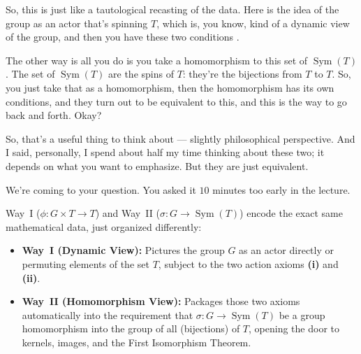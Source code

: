 \begin{speech}[01:10:50 - 01:11:56]
So, this is just like a tautological recasting of the data. Here  is the idea of the group as an actor that's spinning $T$, which is, you know, kind of a dynamic view of the group, and then you have these two conditions .

The other way  is all you do is you take a homomorphism to this set of $\operatorname{Sym}(T)$. The set of $\operatorname{Sym}(T)$ are the spins of $T$: they're the bijections from $T$ to $T$. So, you just take that as a homomorphism, then the homomorphism has its own conditions, and they turn out to be equivalent to this, and this is the way to go back and forth. Okay?

So, that's a useful thing to think about --- slightly philosophical perspective. And I said, personally, I spend about half my time thinking about these two; it depends on what you want to emphasize. But they are just equivalent.

We're coming to your question. You asked it $10$ minutes too early in the lecture.
\end{speech}

\begin{insight}
Way~I ($\phi \colon G \times T \to T$) and Way~II ($\sigma \colon G \to \operatorname{Sym}(T)$) encode the exact same mathematical data, just organized differently:
\begin{itemize}
    \item \textbf{Way~I (Dynamic View):} Pictures the group $G$ as an actor directly  or permuting elements of the set $T$, subject to the two action axioms \textbf{(i)} and \textbf{(ii)}.
    \item \textbf{Way~II (Homomorphism View):} Packages those two axioms automatically into the requirement that $\sigma \colon G \to \operatorname{Sym}(T)$ be a group homomorphism into the group of all  (bijections) of $T$, opening the door to kernels, images, and the First Isomorphism Theorem.
\end{itemize}
\end{insight}

\begin{hidden}
\end{hidden}

